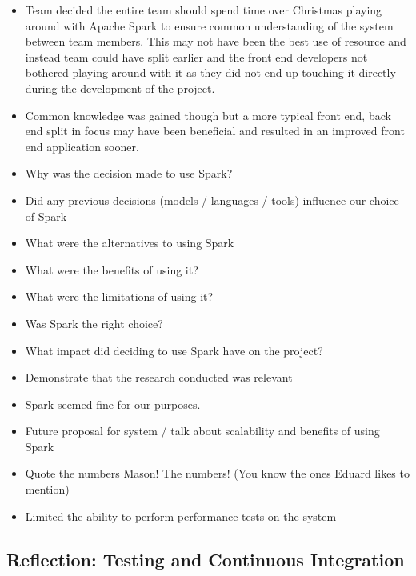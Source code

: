 \documentclass{l3proj}
\begin{document}


\begin{itemize}
\item Team decided the entire team should spend time over Christmas playing around with Apache Spark to ensure common understanding of the system between team members. This may not have been the best use of resource and instead team could have split earlier and the front end developers not bothered playing around with it as they did not end up touching it directly during the development of the project. 
\item Common knowledge was gained though but a more typical front end, back end split in focus may have been beneficial and resulted in an improved front end application sooner.
\item Why was the decision made to use Spark?
\item Did any previous decisions (models / languages / tools) influence our choice of Spark
\item What were the alternatives to using Spark
\item What were the benefits of using it?
\item What were the limitations of using it?
\item Was Spark the right choice?
\item What impact did deciding to use Spark have on the project?
\item Demonstrate that the research conducted was relevant
\item Spark seemed fine for our purposes.
\item Future proposal for system / talk about scalability and benefits of using Spark
\item Quote the numbers Mason! The numbers! (You know the ones Eduard likes to mention)
\item Limited the ability to perform performance tests on the system
\end{itemize}


\subsection{Reflection: Testing and Continuous Integration}
\label{sec:testing}
\end{document}
